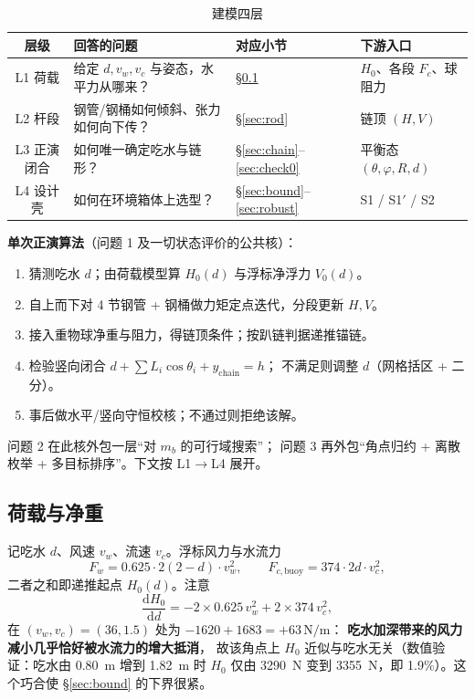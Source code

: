 \documentclass[UTF8,a4paper,zihao=-4]{ctexart}
\begin{document}
\begin{table}[H]
\centering
\caption{建模四层}
\footnotesize
\begin{tabularx}{\textwidth}{cXXX}
\toprule
层级 & 回答的问题 & 对应小节 & 下游入口 \\
\midrule
L1 荷载 & 给定 \(d,v_w,v_c\) 与姿态，水平力从哪来？ & \S\ref{sec:load} & \(H_0\)、各段 \(F_c\)、球阻力 \\
L2 杆段 & 钢管/钢桶如何倾斜、张力如何向下传？ & \S\ref{sec:rod} & 链顶 \((H,V)\) \\
L3 正演闭合 & 如何唯一确定吃水与链形？ & \S\ref{sec:chain}--\ref{sec:check0} & 平衡态 \((\theta,\varphi,R,d)\) \\
L4 设计壳 & 如何在环境箱体上选型？ & \S\ref{sec:bound}--\ref{sec:robust} & S1 / S1\('\) / S2 \\
\bottomrule
\end{tabularx}
\end{table}

\textbf{单次正演算法}（问题 1 及一切状态评价的公共核）：
\begin{enumerate}[leftmargin=1.6em,itemsep=0.12em]
  \item 猜测吃水 \(d\)；由荷载模型算 \(H_0(d)\) 与浮标净浮力 \(V_0(d)\)。
  \item 自上而下对 4 节钢管 + 钢桶做力矩定点迭代，分段更新 \(H,V\)。
  \item 接入重物球净重与阻力，得链顶条件；按趴链判据递推锚链。
  \item 检验竖向闭合 \(d+\sum L_i\cos\theta_i+y_{\mathrm{chain}}=h\)；
        不满足则调整 \(d\)（网格括区 + 二分）。
  \item 事后做水平/竖向守恒校核；不通过则拒绝该解。
\end{enumerate}
问题 2 在此核外包一层“对 \(m_b\) 的可行域搜索”；
问题 3 再外包“角点归约 + 离散枚举 + 多目标排序”。下文按 L1\(\to\)L4 展开。

\subsection{荷载与净重}\label{sec:load}

记吃水 \(d\)、风速 \(v_w\)、流速 \(v_c\)。浮标风力与水流力
\begin{equation}
F_w=0.625\cdot 2(2-d)\cdot v_w^2,\qquad
F_{c,\mathrm{buoy}}=374\cdot 2d\cdot v_c^2,
\end{equation}
二者之和即递推起点 \(H_0(d)\)。注意
\begin{equation}
\frac{\mathrm{d}H_0}{\mathrm{d}d}=-2\times0.625\,v_w^2+2\times374\,v_c^2,
\end{equation}
在 \((v_w,v_c)=(36,1.5)\) 处为 \(-1620+1683=+63\,\mathrm{N/m}\)：
\textbf{吃水加深带来的风力减小几乎恰好被水流力的增大抵消}，
故该角点上 \(H_0\) 近似与吃水无关（数值验证：吃水由 \SI{0.80}{m} 增到 \SI{1.82}{m} 时
\(H_0\) 仅由 \SI{3290}{N} 变到 \SI{3355}{N}，即 1.9\%）。这个巧合使 \S\ref{sec:bound} 的下界很紧。
\end{document}
